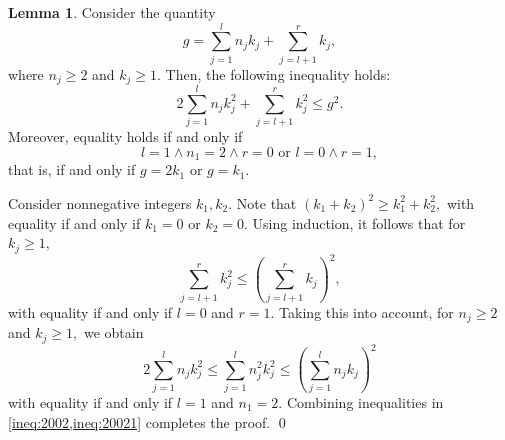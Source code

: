 \documentclass[11pt,leqno]{article}
\theoremstyle{definition}
\newtheorem{lemma}{Lemma}[section]
\newtheorem{remark}{Remark}[section]
\renewenvironment{proof}{{\bfseries \noindent Proof} }{ \qed \\}
\begin{document}
\begin{lemma}
\label{lemma:1202}
Consider the quantity
$$g=\sum_{j=1}^{l}n_jk_j+\sum_{j=l+1}^{r}k_j,$$
where $n_j\geq 2$ and $k_j\geq1$. Then, the following inequality holds:
$$
2\sum_{j=1}^{l}n_jk_j^2+\sum_{j=l+1}^{r}k_j^2\leq g^2.
$$
Moreover, equality holds if and only if 
$$l=1\wedge n_1=2\wedge r=0 \text{ or } l=0\wedge r=1,$$
that is, if and only if $g=2k_1$ or $g=k_1.$
\end{lemma}
\begin{proof}
    Consider nonnegative integers $k_1,k_2$. Note that $(k_1+k_2)^2\geq k_1^2+k_2^2,$ with equality if and only if $k_1=0$ or $k_2=0.$ Using induction, it follows that for $k_j\geq 1,$
\begin{equation}
\label{ineq:2002}
\sum_{j=l+1}^{r}k_j^2\leq\left(\sum_{j=l+1}^{r}k_j\right)^2,
\end{equation}
with equality if and only if $l=0$ and $r=1.$ Taking this into account, for $n_j\geq 2$ and $k_j\geq1,$ we obtain
\begin{equation}
\label{ineq:20021}
2\sum_{j=1}^{l}n_jk_j^2\leq\sum_{j=1}^{l}n_j^2k_j^2\leq\left(\sum_{j=1}^{l}n_jk_j \right)^2
\end{equation}
with equality if and only if $l=1$ and $n_1=2.$ Combining inequalities in \cref{ineq:2002,ineq:20021} completes the proof.
\end{proof}

 
\end{document}
